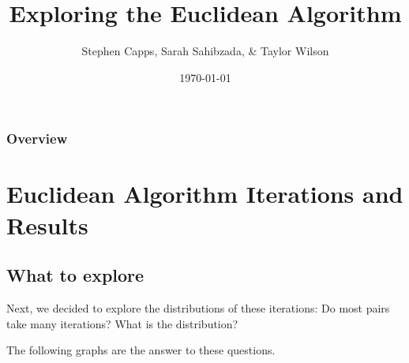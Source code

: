 \documentclass{beamer}
\title[Euclidean Algorithm]{Exploring the Euclidean Algorithm} %
\author{Stephen Capps, Sarah Sahibzada, \& Taylor Wilson} %
\institute[TAMU] %
{
Texas A\&{}M University \\ %
\medskip
\textit{Supervisor: Sara Pollock} %
}
\date{\today} %
\begin{document}
\begin{frame}
\titlepage %
\end{frame}

\begin{frame}
\frametitle{Overview} %
\tableofcontents %
\end{frame}




\section{Euclidean Algorithm Iterations and Results}

\subsection{What to explore}
\begin{frame}
Next, we decided to explore the distributions of these iterations:
Do most pairs take many iterations? What is the distribution?

The following graphs are the answer to these questions.


\end{frame}
\end{document}
